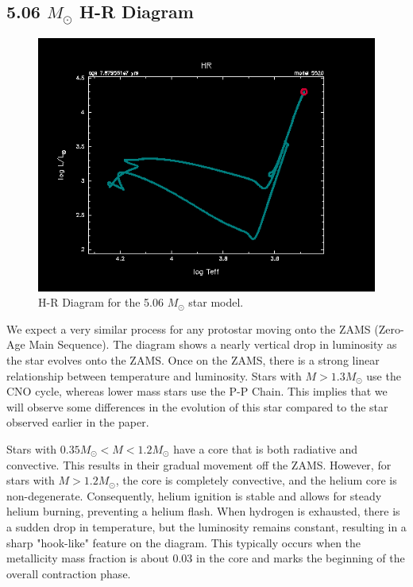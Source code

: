 \documentclass[fleqn,usenatbib]{mnras}
\begin{document}
\subsection{5.06 \(M_\odot\) H-R Diagram}

\begin{figure}

    \includegraphics[width=\columnwidth]{hr_profile_05520.png}
    \caption{H-R Diagram for the 5.06 \(M_\odot\) star model.}
    \label{fig:5.06_M_sun_HR_figure} %
\end{figure}

\par We expect a very similar process for any protostar moving onto the ZAMS (Zero-Age Main Sequence). The diagram shows a nearly vertical drop in luminosity as the star evolves onto the ZAMS. Once on the ZAMS, there is a strong linear relationship between temperature and luminosity. Stars with \(M > 1.3 M_\odot\) use the CNO cycle, whereas lower mass stars use the P-P Chain. This implies that we will observe some differences in the evolution of this star compared to the star observed earlier in the paper.

\par Stars with \(0.35 M_\odot < M < 1.2 M_\odot\) have a core that is both radiative and convective. This results in their gradual movement off the ZAMS. However, for stars with \(M > 1.2 M_\odot\), the core is completely convective, and the helium core is non-degenerate. Consequently, helium ignition is stable and allows for steady helium burning, preventing a helium flash. When hydrogen is exhausted, there is a sudden drop in temperature, but the luminosity remains constant, resulting in a sharp "hook-like" feature on the diagram. This typically occurs when the metallicity mass fraction is about 0.03 in the core and marks the beginning of the overall contraction phase.
\end{document}
